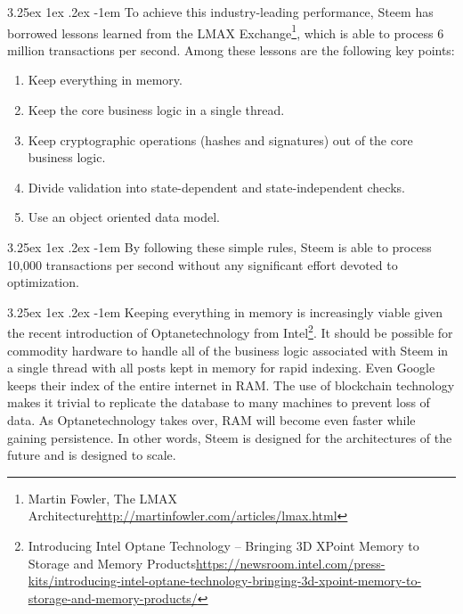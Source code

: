 \documentclass{article}
\makeatletter
\renewcommand\paragraph{\@startsection{paragraph}{5}{\z@}%
  {3.25ex \@plus1ex \@minus.2ex}%
  {-1em}%
  {\normalfont\normalsize\bfseries}}
\makeatother
\begin{document}
			\paragraph{}
				To achieve this industry-leading performance, Steem has borrowed lessons learned from the LMAX Exchange\footnote{Martin Fowler, The LMAX Architecture\newline\url{http://martinfowler.com/articles/lmax.html}}, which is able to process 6 million transactions per second. Among these lessons are the following key points:

			\begin{enumerate}
				\item Keep everything in memory.
				\item Keep the core business logic in a single thread.
				\item Keep cryptographic operations (hashes and signatures) out of the core business logic.
				\item Divide validation into state-dependent and state-independent checks.
				\item Use an object oriented data model.
			\end{enumerate}

			\paragraph{}
				By following these simple rules, Steem is able to process 10,000 transactions per second without any significant effort devoted to optimization.

			\paragraph{}
				Keeping everything in memory is increasingly viable given the recent introduction of Optane\texttrademark technology from Intel\footnote{Introducing Intel Optane Technology – Bringing 3D XPoint Memory to Storage and Memory Products\newline\url{https://newsroom.intel.com/press-kits/introducing-intel-optane-technology-bringing-3d-xpoint-memory-to-storage-and-memory-products/}}. It should be possible for commodity hardware to handle all of the business logic associated with Steem in a single thread with all posts kept in memory for rapid indexing. Even Google keeps their index of the entire internet in RAM. The use of blockchain technology makes it trivial to replicate the database to many machines to prevent loss of data. As Optane\texttrademark technology takes over, RAM will become even faster while gaining persistence. In other words, Steem is designed for the architectures of the future and is designed to scale.
\end{document}
